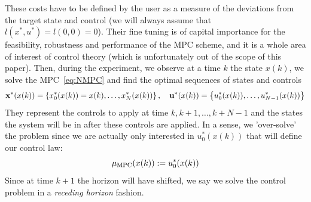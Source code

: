 \documentclass[12pt]{article}
\begin{document}
\vspace{12pt}

These costs have to be defined by the user as a measure of the deviations from the target state and control (we will always assume that $l(x^*,u^*)=l(0,0)=0$).
Their fine tuning is of capital importance for the feasibility, robustness and performance of the MPC scheme, and it is a whole area of interest of control theory (which is unfortunately out of the scope of this paper).
Then, during the experiment, we observe at a time $k$ the state $x(k)$, we solve the MPC~\ref{eq:NMPC} and find the optimal sequences of states and controls $$\bf{x}^*(x(k))=\left\{ x_0^*(x(k))=x(k),\ldots,x_N^*(x(k))\right\},\quad \bf{u}^*(x(k))=\left\{ u_0^*(x(k)),\ldots,u_{N-1}^*(x(k))\right\}$$
They represent the controls to apply at time $k,k+1,\ldots,k+N-1$ and the states the system will be in after these controls are applied.
In a sense, we 'over-solve' the problem since we are actually only interested in $u_0^*(x(k))$ that will define our control law:
$$\mu_{\rm{MPC}}(x(k)):=u_0^*(x(k))$$
Since at time $k+1$ the horizon will have shifted, we say we solve the control problem in a \textit{receding horizon} fashion.
\end{document}
